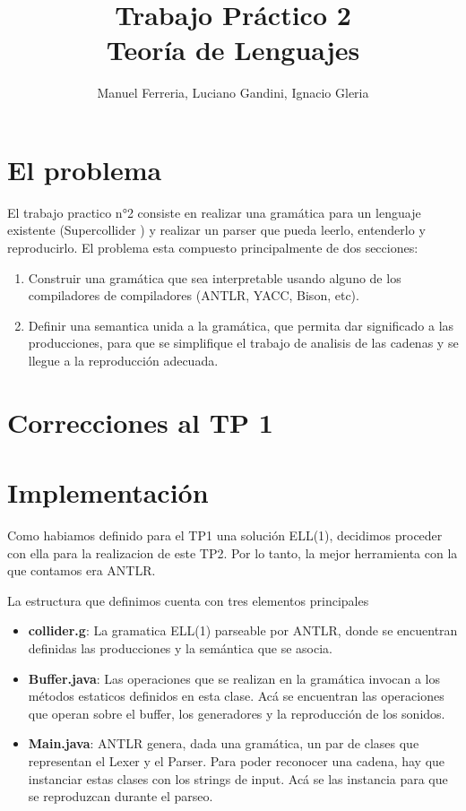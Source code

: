\documentclass[a4paper]{article}
\title{Trabajo Pr\'actico 2 \\ Teoría de Lenguajes}
\author{Manuel Ferreria, Luciano Gandini, Ignacio Gleria}
\begin{document}
\maketitle


\section{El problema}
El trabajo practico n°2 consiste en realizar una gram\'atica para un lenguaje
existente (Supercollider \url{}) y realizar un parser que pueda leerlo, entenderlo
y reproducirlo. El problema esta compuesto principalmente de dos secciones:
\begin{enumerate}
    \item Construir una gram\'atica que sea interpretable usando alguno de los
        compiladores de compiladores (ANTLR, YACC, Bison, etc).
    \item Definir una semantica unida a la gram\'atica, que permita dar significado
        a las producciones, para que se simplifique el trabajo de analisis de las
        cadenas y se llegue a la reproducci\'on adecuada.
\end{enumerate}

\section{Correcciones al TP 1}

\section{Implementaci\'on}

Como habiamos definido para el TP1 una soluci\'on ELL(1), decidimos proceder con
ella para la realizacion de este TP2. Por lo tanto, la mejor herramienta con la
que contamos era ANTLR. 

La estructura que definimos cuenta con tres elementos principales
\begin{itemize}
    \item \textbf{collider.g}: La gramatica ELL(1) parseable por ANTLR,
        donde se encuentran definidas las producciones y la sem\'antica
        que se asocia.
    \item \textbf{Buffer.java}: Las operaciones que se realizan en la 
        gram\'atica invocan a los m\'etodos estaticos definidos en esta
        clase. Ac\'a se encuentran las operaciones que operan sobre el 
        buffer, los generadores y la reproducci\'on de los sonidos.
    \item \textbf{Main.java}: ANTLR genera, dada una gram\'atica, un
        par de clases que representan el Lexer y el Parser. Para
        poder reconocer una cadena, hay que instanciar estas clases
        con los strings de input. Ac\'a se las instancia para que se 
        reproduzcan durante el parseo.
\end{itemize}
\end{document}
